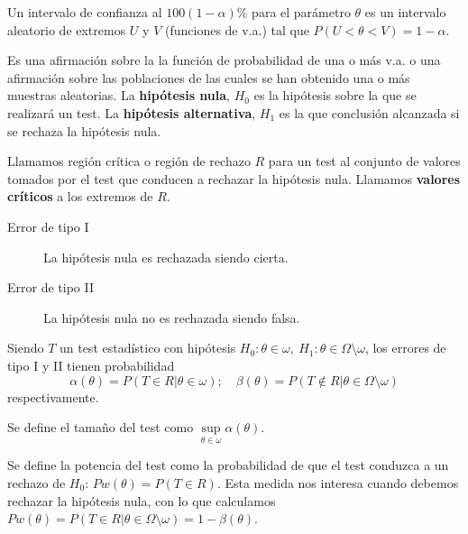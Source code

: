 	
\begin{definicion}
	Un intervalo de confianza al $100(1-\alpha)\%$ para el parámetro $\theta$ es un intervalo aleatorio de extremos $U$ y $V$ (funciones de v.a.) tal que $P(U < \theta < V) = 1-\alpha$.
\end{definicion}
	
\begin{definicion}
	Es una afirmación sobre la la función de probabilidad de una o más v.a. o una afirmación sobre las poblaciones de las cuales se han obtenido una o más muestras aleatorias. La \textbf{hipótesis nula}, $H_0$ es la hipótesis sobre la que se realizará un test. La \textbf{hipótesis alternativa}, $H_1$ es la que conclusión alcanzada si se rechaza la hipótesis nula.
\end{definicion}

\begin{definicion}
	Llamamos región crítica o región de rechazo $R$ para un test al conjunto de valores tomados por el test que conducen a rechazar la hipótesis nula. Llamamos \textbf{valores críticos} a los extremos de $R$.
\end{definicion}

\begin{definicion}\textit{}
	\begin{description}
	\item[Error de tipo I] La hipótesis nula es rechazada siendo cierta.
	\item[Error de tipo II] La hipótesis nula no es rechazada siendo falsa.
	\end{description}
\end{definicion}

	Siendo $T$ un test estadístico con hipótesis $H_0: \theta \in \omega, \ H_1: \theta \in \Omega \setminus \omega$, los errores de tipo I y II tienen probabilidad
	\[ 
	\alpha(\theta) = P(T \in R | \theta \in \omega); \quad
	\beta(\theta) = 
		P(T \not\in R | 
				\theta \in \Omega \setminus \omega)
	\]
	respectivamente.

\begin{definicion}
	Se define el tamaño del test como $\underset{\theta \in \omega}\sup \alpha(\theta)$.
\end{definicion}

\begin{definicion}
	Se define la potencia del test como la probabilidad de que el test conduzca a un rechazo de $H_0$: $Pw(\theta) = P(T \in R)$. Esta medida nos interesa cuando debemos rechazar la hipótesis nula, con lo que calculamos $Pw(\theta) = P(T \in R | \theta \in \Omega \setminus \omega) = 1 - \beta(\theta)$. 
\end{definicion}
	
